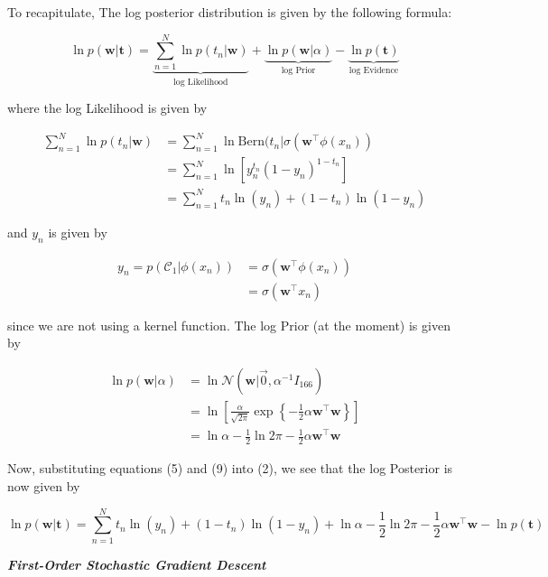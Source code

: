 \documentclass[12pt]{extarticle}
\begin{document}
To recapitulate, The log posterior distribution is given by the following formula:

\begin{equation}
    \ln p(\textbf{w}|\textbf{t}) = \underbrace{\sum_{n=1}^N \ln p(t_n|\textbf{w})}_{\text{log Likelihood}} + \underbrace{\ln p(\textbf{w}|\alpha)}_{\text{log Prior}} - \underbrace{\ln p(\textbf{t})}_{\text{log Evidence}}
\end{equation}

where the log Likelihood is given by

\begin{align}
    \sum_{n=1}^N \ln p(t_n|\textbf{w}) &= \sum_{n=1}^N \ln \mathrm{Bern}(t_n | \sigma(\textbf{w}^\top \phi(x_n)) \\
    &= \sum_{n=1}^N \ln [y_n^{t_n}(1-y_n)^{1-t_n}] \\
    &= \sum_{n=1}^N t_n\ln (y_n) + (1-t_n) \ln (1-y_n)
\end{align}

and $y_n$ is given by

\begin{align}
	y_n = p(\mathcal{C}_1|\phi(x_n)) &= \sigma(\textbf{w}^\top \phi(x_n)) \\
	&= \sigma(\textbf{w}^\top x_n)
\end{align}

since we are not using a kernel function. The log Prior (at the moment) is given by

\begin{align}
    \ln p(\textbf{w}|\alpha) &= \ln \mathcal{N}(\mathbf{w}|\vec{0}, \alpha^{-1} I_{166}) \\
    &= \ln \left[ \frac{\alpha}{\sqrt{2 \pi}} \exp \left\{-\frac{1}{2} \alpha \mathbf{w}^\top \mathbf{w}\right\} \right] \\
    &= \ln \alpha - \frac{1}{2} \ln 2\pi - \frac{1}{2} \alpha \mathbf{w}^\top \mathbf{w}
\end{align}

Now, substituting equations (5) and (9) into (2), we see that the log Posterior is now given by

\begin{equation}
    \ln p(\textbf{w}|\textbf{t}) = \sum_{n=1}^N t_n\ln (y_n) + (1-t_n) \ln (1-y_n) + \ln \alpha - \frac{1}{2} \ln 2\pi - \frac{1}{2} \alpha \mathbf{w}^\top \mathbf{w} - \ln p(\mathbf{t})
\end{equation}

\newpage

\textbf{\textit{First-Order Stochastic Gradient Descent}}
\end{document}
